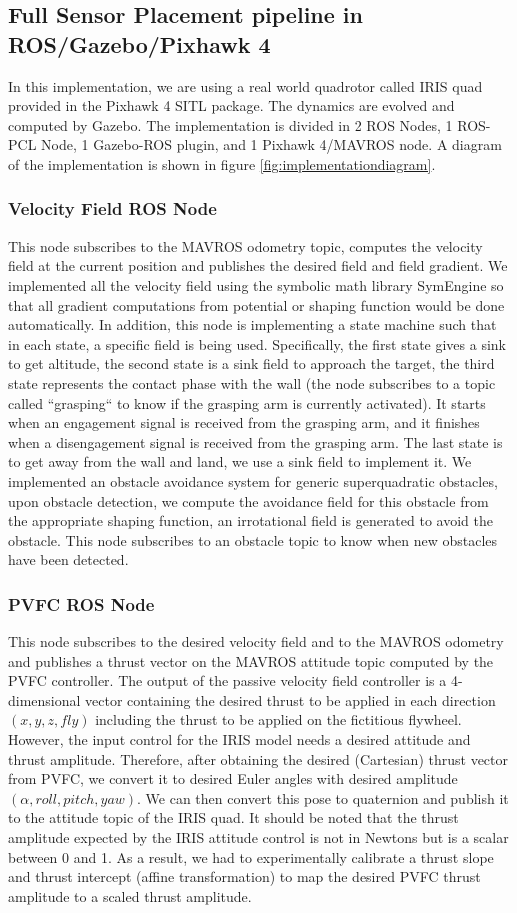 \subsection{Full Sensor Placement pipeline in ROS/Gazebo/Pixhawk 4}
In this implementation, we are using a real world quadrotor called IRIS quad provided in the Pixhawk 4 SITL package. 
The dynamics are evolved and computed by Gazebo. 
The implementation is divided in 2 ROS Nodes, 1 ROS-PCL Node, 1 Gazebo-ROS plugin, and 1 Pixhawk 4/MAVROS node.
A diagram of the implementation is shown in figure \ref{fig:implementationdiagram}.
\subsubsection{Velocity Field ROS Node}
This node subscribes to the MAVROS odometry topic, computes the velocity field at the current position and publishes the desired field and field gradient. 
We implemented all the velocity field using the symbolic math library SymEngine so that all gradient computations from potential or shaping function would be done automatically. 
In addition, this node is implementing a state machine such that in each state, a specific field is being used.
Specifically, the first state gives a sink to get altitude, the second state is a sink field to approach the target, 
the third state represents the contact phase with the wall (the node subscribes to a topic called ``grasping`` to know if the grasping arm is currently activated). It starts when an engagement signal is received from the grasping arm, and it finishes when a disengagement signal is received from the grasping arm. 
The last state is to get away from the wall and land, we use a sink field to implement it.
We implemented an obstacle avoidance system for generic superquadratic obstacles, upon obstacle detection, we compute the avoidance field for this obstacle from the appropriate shaping function, an irrotational field is generated to avoid the obstacle. This node subscribes to an obstacle topic to know when new obstacles have been detected. 
\subsubsection{PVFC ROS Node}
This node subscribes to the desired velocity field and to the MAVROS odometry and publishes a thrust vector on the MAVROS attitude topic computed by the PVFC controller. The output of the passive velocity field controller is a 4-dimensional vector containing the desired thrust to be applied in each direction $(x,y,z, fly)$ including the thrust to be applied on the fictitious flywheel. 
However, the input control for the IRIS model needs a desired attitude and thrust amplitude. Therefore, after obtaining the desired (Cartesian) thrust vector from PVFC, we convert it to desired Euler angles with desired amplitude $(\alpha, roll, pitch, yaw)$. 
We can then convert this pose to quaternion and publish it to the attitude topic of the IRIS quad.
It should be noted that the thrust amplitude expected by the IRIS attitude control is not in Newtons but is a scalar between 0 and 1. As a result, we had to experimentally calibrate a thrust slope and thrust intercept (affine transformation) to map the desired PVFC thrust amplitude to a scaled thrust amplitude. 

